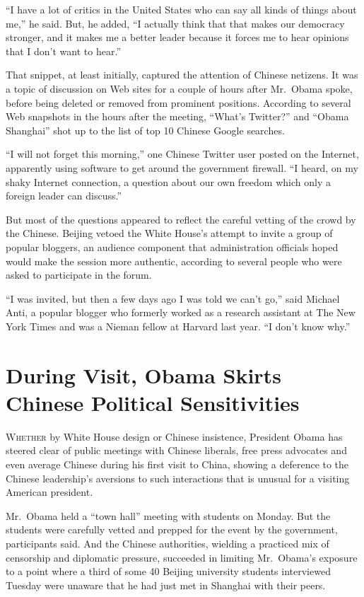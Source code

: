 ﻿\documentclass[12pt]{article}
\begin{document}
``I have a lot of critics in the United States who can say all kinds of things about me,'' he said.
But, he added, ``I actually think that that makes our democracy stronger, and it makes me a better
leader because it forces me to hear opinions that I don't want to hear.''

That snippet, at least initially, captured the attention of Chinese netizens. It was a topic of
discussion on Web sites for a couple of hours after Mr.~Obama spoke, before being deleted or removed
from prominent positions. According to several Web snapshots in the hours after the meeting,
``What's Twitter?'' and ``Obama Shanghai'' shot up to the list of top 10 Chinese Google searches.

``I will not forget this morning,'' one Chinese Twitter user posted on the Internet, apparently
using software to get around the government firewall. ``I heard, on my shaky Internet connection, a
question about our own freedom which only a foreign leader can discuss.''

But most of the questions appeared to reflect the careful vetting of the crowd by the Chinese.
Beijing vetoed the White House's attempt to invite a group of popular bloggers, an audience
component that administration officials hoped would make the session more authentic, according to
several people who were asked to participate in the forum.

``I was invited, but then a few days ago I was told we can't go,'' said Michael Anti, a popular
blogger who formerly worked as a research assistant at The New York Times and was a Nieman fellow at
Harvard last year. ``I don't know why.''

\section{During Visit, Obama Skirts Chinese Political Sensitivities}

\lettrine{W}{hether} by White House design or Chinese insistence, President
Obama has steered clear of public meetings with Chinese liberals, free press advocates and even
average Chinese during his first visit to China, showing a deference to the Chinese leadership's
aversions to such interactions that is unusual for a visiting American president.

Mr.~Obama held a ``town hall'' meeting with students on Monday. But the students were carefully
vetted and prepped for the event by the government, participants said. And the Chinese authorities,
wielding a practiced mix of censorship and diplomatic pressure, succeeded in limiting Mr.~Obama's
exposure to a point where a third of some 40 Beijing university students interviewed Tuesday were
unaware that he had just met in Shanghai with their peers.
\end{document}
